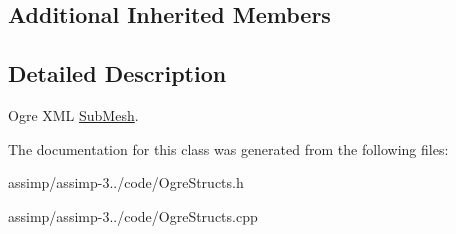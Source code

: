 \subsection*{Additional Inherited Members}


\subsection{Detailed Description}
Ogre X\+M\+L \hyperlink{class_assimp_1_1_ogre_1_1_sub_mesh}{Sub\+Mesh}. 

The documentation for this class was generated from the following files\+:\begin{DoxyCompactItemize}
\item 
assimp/assimp-\/3../code/Ogre\+Structs.\+h\item 
assimp/assimp-\/3../code/Ogre\+Structs.\+cpp\end{DoxyCompactItemize}
